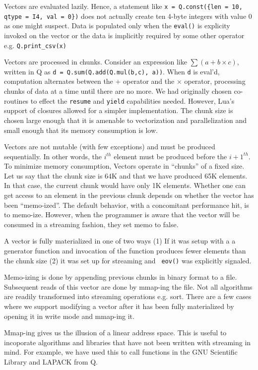 Vectors are evaluated lazily. Hence, a statement like 
{\tt x = Q.const(\{len = 10, qtype = I4, val = 0\})} does not actually create
ten
4-byte integers with value 0 as one might suspect. Data is populated only when
the {\tt eval()} is explicity invoked on the vector or the data is 
implicitly required by some other operator e.g. {\tt Q.print\_csv(x)}

Vectors are processed in chunks. Consider an expression  like \(\sum (a + b\times
c)\), written in Q as {\tt d = Q.sum(Q.add(Q.mul(b,c), a))}.
When {\tt d} is eval'd, computation alternates between the \(+\) operator
and the \(\times\) operator, processing chunks of data at a time until there are
no more.
We had originally chosen co-routines to effect the {\tt resume} and
{\tt yield} capabilities needed. However, Lua's support of closures allowed for
a simpler implementation.
The chunk size is chosen large enough that it is amenable to
vectorization and parallelization and small enough that its memory consumption
is low.

Vectors are not mutable (with few exceptions)
and must be produced sequentially. In other words, the \(i^{th}\) element must
be produced before the \({i+1}^{th}\). To minimize memory consumption, Vectors
operate in ``chunks'' of a fixed size. Let us say that the chunk size is 64K and
that we have produced 65K elements. In that case, the current chunk would have
only 1K elements. Whether one can get access to an element in the previous chunk
depends on whether the vector has been ``memo-ized''. The default behavior, with
a concomitant performance hit, is to memo-ize. However, when the programmer is
aware that the vector will be consumed in a streaming fashion, they set memo
to false. 

A vector is fully materialized in one of two ways (1) If it was setup with a a generator function and invocation of the function produces 
fewer elements than the chunk size (2) it was set up for streaming and {\tt
eov()} was explicitly signaled.

Memo-izing is done by appending previous chunks in binary format to a file.
Subsequent reads of this vector are done by mmap-ing the file. Not all
algorithms are readily transformed into streaming operations e.g. sort. There
are a few cases where we support modifying a vector after it has been fully
materialized by opening it in write mode and mmap-ing it.

Mmap-ing gives us the illusion of a linear address space. This is useful to
incoporate algorithms and libraries that have not been written with streaming in
mind. For example, we have used this to call functions in the GNU Scientific
Library and LAPACK from Q.

